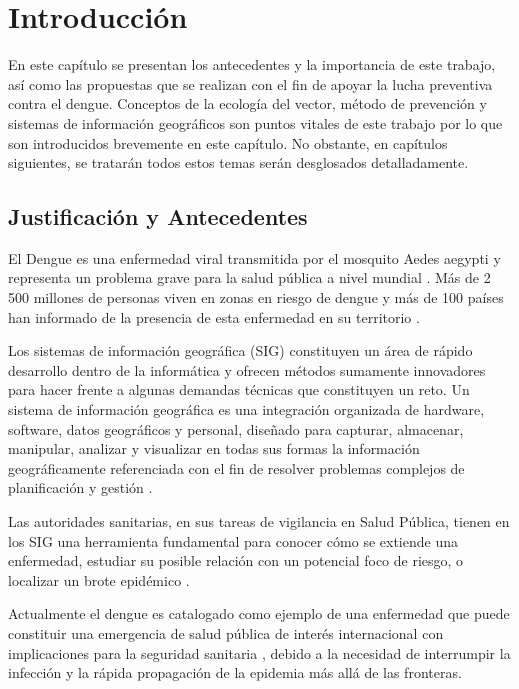 \chapter{Introducción}
En este capítulo se presentan los antecedentes y la importancia de este trabajo, así como las
propuestas que se realizan con el fin de apoyar la lucha preventiva contra el dengue. Conceptos de
la ecología del vector, método de prevención y sistemas de información geográficos son puntos
vitales de este trabajo por lo que son introducidos brevemente en este capítulo. No obstante, en
capítulos siguientes, se tratarán todos estos temas serán desglosados detalladamente.

\section{Justificación y Antecedentes}

El Dengue es una enfermedad viral transmitida por el mosquito Aedes aegypti y representa un
problema grave para la salud pública a nivel mundial \citep{dengueUruguayCap1, world2009dengue, DIBO2005}. Más de 2 500 millones de personas viven en
zonas en riesgo de dengue y más de 100 países han informado de la presencia de esta enfermedad en
su territorio \cite{world2009dengue, gustavo2006dengue}.

Los sistemas de información geográfica (SIG) constituyen un área de rápido desarrollo dentro
de la informática y ofrecen métodos sumamente innovadores para hacer frente a algunas demandas
técnicas que constituyen un reto. Un sistema de información geográfica es una integración
organizada de hardware, software, datos geográficos y personal, diseñado para capturar, almacenar,
manipular, analizar y visualizar en todas sus formas la información geográficamente referenciada
con el fin de resolver problemas complejos de planificación y gestión \citep{lopezMarcos2007}.

Las autoridades sanitarias, en sus tareas de vigilancia en Salud Pública, tienen en los SIG una
herramienta fundamental para conocer cómo se extiende una enfermedad, estudiar su posible relación
con un potencial foco de riesgo, o localizar un brote epidémico \citep{vgomesAegis2001}.

Actualmente el dengue es catalogado como ejemplo de una enfermedad que puede constituir una
emergencia de salud pública de interés internacional con implicaciones para la seguridad
sanitaria \citep{dengueUruguayCap1, world2009dengue}, debido a la necesidad de interrumpir la infección y la rápida propagación de la
epidemia más allá de las fronteras.

